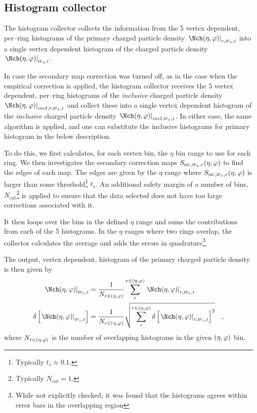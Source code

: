 \subsection{Histogram collector}
\label{sec:sub:hist_collector}

The histogram collector collects the information from the 5 vertex
dependent, per--ring histograms of the primary charged particle
density $\dndetadphi[r,\subIPz,i]$ into a single vertex dependent
histogram of the charged particle density $\dndetadphi[\subIPz,i]$.

In case the secondary map correction was turned off, as in the case
when the empirical correction is applied, the histogram collector
receives the 5 vertex dependent, per--ring histograms of the
\emph{inclusive} charged particle density
$\dndetadphi[incl,r,\subIPz,i]$ and collect these into a single vertex
dependent histogram of the \emph{inclusive} charged particle density
$\dndetadphi[incl,\subIPz,i]$.  In either case, the same algorithm is
applied, and one can substitute the inclusive histograms for primary
histogram in the below description. 

To do this, we first calculates, for each vertex bin, the $\eta$ bin
range to use for each ring.  We then investigates the secondary
correction maps $\SecMap{}$ to find the edges of each map.  The edges
are given by the $\eta$ range where $\SecMap{}$ is larger than some
threshold\footnote{Typically $t_s\approx 0.1$.}  $t_s$. An additional
safety margin of a number of bins, $N_{cut}$\footnote{Typically
  $N_{cut}=1$.} is applied to ensure that the data selected does not
have too large corrections associated with it.

It then loops over the bins in the defined $\eta$ range and sums the
contributions from each of the 5 histograms.  In the $\eta$ ranges
where two rings overlap, the collector calculates the average and adds
the errors in quadrature\footnote{While not explicitly checked, it was
  found that the histograms agrees within error bars in the
  overlapping region}.

The output, vertex dependent, histogram of the primary
charged particle density is then given by
\begin{align}
  \label{eq:superhist}
  \dndetadphi[\subIPz,i] &=
  \frac{1}{N_{r\in\etaphi}}\sum_{r}^{r\in\etaphi}  
  \dndetadphi[r,\subIPz,i]\\
  \delta\left[\dndetadphi[\subIPz,i]\right] &=
  \frac{1}{N_{r\in\etaphi}}\sqrt{\sum_{r}^{r\in\etaphi}   
    \delta\left[\dndetadphi[r,\subIPz,i]\right]^2}
  \quad,
\end{align}
where $N_{r\in(\eta,\varphi)}$ is the number of overlapping histograms
in the given $(\eta,\varphi)$ bin. 


